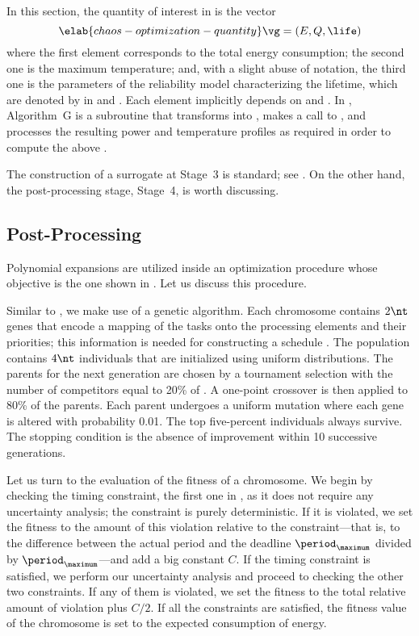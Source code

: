 In this section, the quantity of interest \g in  is the
vector
\begin{equation} \elab{chaos-optimization-quantity}
  \vg = (E, Q, \life)
\end{equation}
where the first element corresponds to the total energy consumption; the second
one is the maximum temperature; and, with a slight abuse of notation, the third
one is the parameters of the reliability model characterizing the lifetime,
which are denoted by \vg in  and
. Each element implicitly depends on \schedule
and \vu. In , Algorithm~G is a subroutine that
transforms \vz into \vu, makes a call to
, and processes the resulting
power and temperature profiles as required in order to compute the above \vg.

The construction of a surrogate at Stage~3 is standard; see
. On the other hand, the post-processing stage,
Stage~4, is worth discussing.

\subsection{Post-Processing}

Polynomial expansions are utilized inside an optimization procedure whose
objective is the one shown in . Let us
discuss this procedure.

Similar to , we make use of a genetic algorithm. Each
chromosome contains $2 \nt$ genes that encode a mapping of the tasks onto the
processing elements and their priorities; this information is needed for
constructing a schedule \schedule. The population contains $4 \nt$ individuals
that are initialized using uniform distributions. The parents for the next
generation are chosen by a tournament selection with the number of competitors
equal to 20\% of \nt. A one-point crossover is then applied to 80\% of the
parents. Each parent undergoes a uniform mutation where each gene is altered
with probability 0.01. The top five-percent individuals always survive. The
stopping condition is the absence of improvement within 10 successive
generations.

Let us turn to the evaluation of the fitness of a chromosome. We begin by
checking the timing constraint, the first one in
, as it does not require any uncertainty
analysis; the constraint is purely deterministic. If it is violated, we set the
fitness to the amount of this violation relative to the constraint---that is, to
the difference between the actual period and the deadline $\period_\maximum$
divided by $\period_\maximum$---and add a big constant $C$. If the timing
constraint is satisfied, we perform our uncertainty analysis and proceed to
checking the other two constraints. If any of them is violated, we set the
fitness to the total relative amount of violation plus $C / 2$. If all the
constraints are satisfied, the fitness value of the chromosome is set to the
expected consumption of energy.

